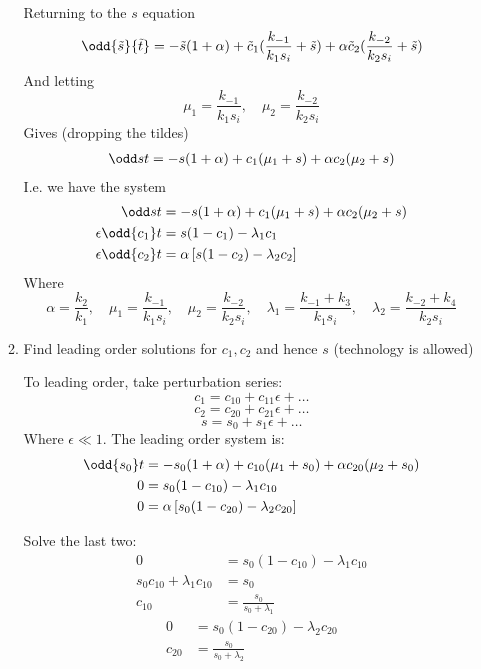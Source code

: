 \documentclass{X:/Documents/Coding/Latex/myassignment}
\begin{document}
\begin{enumerate}
\begin{enumerate}
		Returning to the $s$ equation
		\begin{align*}
			\odd{\tilde s}{\tilde t} &=-\tilde{s}(1 +\alpha) + \tilde{c}_1 (\frac{k_{-1}}{k_1 s_i} + \tilde{s}) + \alpha \tilde{c}_2(\frac{k_{-2}}{k_2s_i} + \tilde{s})\\
		\end{align*}
		And letting
		\[\mu_1 = \frac{k_{-1}}{k_1 s_i}, \quad \mu_2 = \frac{k_{-2}}{k_2 s_i}\]
		Gives (dropping the tildes)
		\begin{align*}
			\odd st &= -s (1+\alpha) + c_1 (\mu_1 + s) + \alpha c_2 ( \mu_2 + s)\\
		\end{align*}
		I.e. we have the system
		\begin{align*}
			\odd st &= -s (1+\alpha) + c_1 (\mu_1 + s) + \alpha c_2 ( \mu_2 + s)\\
			\epsilon \odd{c_1}t &= s(1-c_1) - \lambda_1 c_1\\
			\epsilon \odd{c_2}t &= \alpha \left[ s (1- c_2) - \lambda_2 c_2\right]
		\end{align*}
		Where
		\[\alpha = \frac{k_2}{k_1}, \quad 
		\mu_1 = \frac{k_{-1}}{k_1 s_i},\quad 
		\mu_2 = \frac{k_{-2}}{k_2 s_i},\quad 
		\lambda_1 = \frac{k_{-1} + k_3}{k_1s_i},\quad 
		\lambda_2 = \frac{k_{-2} + k_4}{k_2 s_i}\]
		
		




		\item Find leading order solutions for $c_1,c_2$ and hence $s$ (technology is allowed)

		To leading order, take perturbation series:
		\[c_1 = c_{10} + c_{11}\epsilon + \ldots\]
		\[c_2 = c_{20} + c_{21}\epsilon + \ldots\]
		\[s = s_{0} + s_{1}\epsilon + \ldots\]
		Where $\epsilon \ll 1$.
		The leading order system is:
		\begin{align*}
			\odd{s_0}t &= -s_0 (1+\alpha) + c_{10} (\mu_1 + s_0) + \alpha c_{20} ( \mu_2 + s_0)\\
			0 &= s_0(1-c_{10}) - \lambda_1 c_{10}\\
			0 &= \alpha \left[ s_0 (1- c_{20}) - \lambda_2 c_{20}\right]
		\end{align*}

		Solve the last two:
		\begin{align*}
			0 &= s_0(1-c_{10}) - \lambda_1 c_{10}\\
			s_0c_{10} + \lambda_1 c_{10} &= s_0\\
			c_{10} &= \frac{s_0}{s_0+\lambda_1}
		\end{align*}
		\begin{align*}
			0 &=  s_0 (1- c_{20}) - \lambda_2 c_{20}\\
			c_{20} &= \frac{s_0}{s_0+\lambda_2}
		\end{align*}


\end{enumerate}
\end{enumerate}
\end{document}
